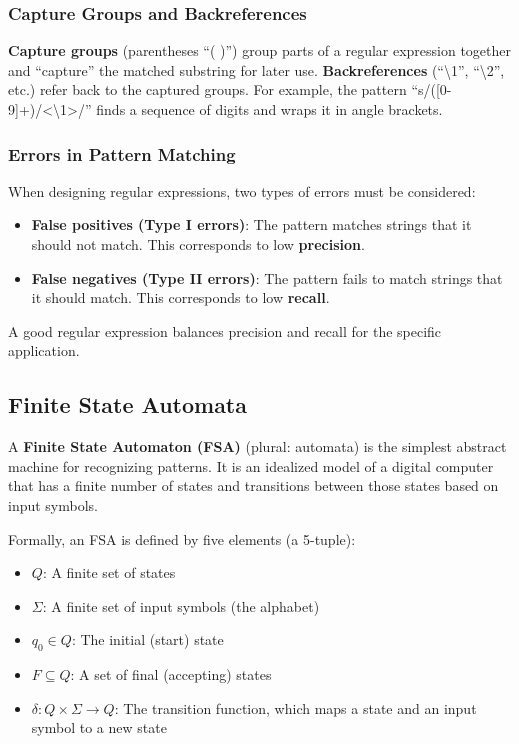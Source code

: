 \documentclass[11pt,a4paper]{article}
\begin{document}
\subsubsection{Capture Groups and Backreferences}

\textbf{Capture groups} (parentheses ``( )'') group parts of a regular expression together and ``capture'' the matched substring for later use. \textbf{Backreferences} (``\textbackslash 1'', ``\textbackslash 2'', etc.) refer back to the captured groups. For example, the pattern ``s/([0-9]+)/<\textbackslash 1>/'' finds a sequence of digits and wraps it in angle brackets.

\subsubsection{Errors in Pattern Matching}

When designing regular expressions, two types of errors must be considered:
\begin{itemize}
    \item \textbf{False positives (Type I errors)}: The pattern matches strings that it should not match. This corresponds to low \textbf{precision}.
    \item \textbf{False negatives (Type II errors)}: The pattern fails to match strings that it should match. This corresponds to low \textbf{recall}.
\end{itemize}

A good regular expression balances precision and recall for the specific application.

\subsection{Finite State Automata}

A \textbf{Finite State Automaton (FSA)} (plural: automata) is the simplest abstract machine for recognizing patterns. It is an idealized model of a digital computer that has a finite number of states and transitions between those states based on input symbols.

Formally, an FSA is defined by five elements (a 5-tuple):
\begin{itemize}
    \item $Q$: A finite set of states
    \item $\Sigma$: A finite set of input symbols (the alphabet)
    \item $q_0 \in Q$: The initial (start) state
    \item $F \subseteq Q$: A set of final (accepting) states
    \item $\delta: Q \times \Sigma \to Q$: The transition function, which maps a state and an input symbol to a new state
\end{itemize}
\end{document}
